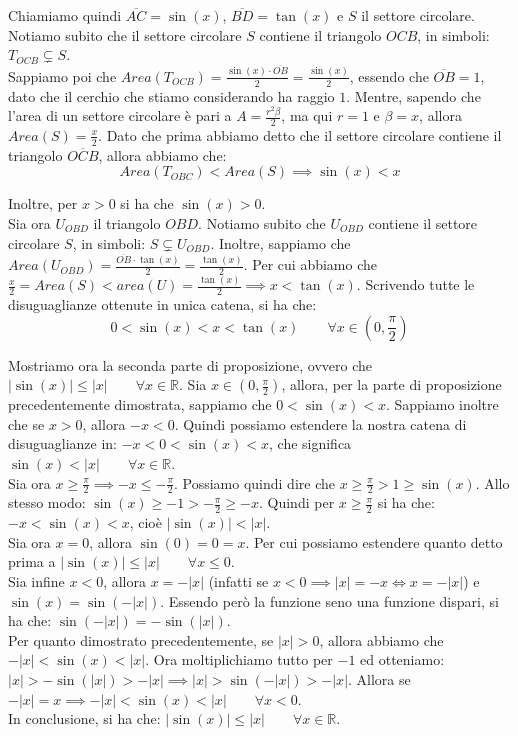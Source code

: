 \documentclass{article}
\begin{document}
\noindent Chiamiamo quindi $\overline{AC} = \sin(x)$, $\overline{BD} = \tan(x)$ e $S$ il settore circolare. Notiamo subito che il settore circolare $S$ contiene il triangolo $OCB$, in simboli: $T_{OCB} \subsetneq S$.\\
Sappiamo poi che $Area(T_{OCB}) = \frac{\sin(x) \cdot \overline{OB}}{2} = \frac{\sin(x)}{2}$, essendo che $\overline{OB} = 1$, dato che il cerchio che stiamo considerando ha raggio $1$. Mentre, sapendo che l'area di un settore circolare è pari a $A = \frac{r^2 \beta}{2}$, ma qui $r = 1$ e $\beta = x$, allora $Area(S) = \frac{x}{2}$. Dato che prima abbiamo detto che il settore circolare contiene il triangolo $\overline{OCB}$, allora abbiamo che:
\begin{equation*}
    Area(T_{OBC}) < Area(S) \implies \sin(x) < x
\end{equation*}

\noindent Inoltre, per $x > 0$ si ha che $\sin(x) > 0$.\\
Sia ora $U_{OBD}$ il triangolo $OBD$. Notiamo subito che $U_{OBD}$ contiene il settore circolare $S$, in simboli: $S \subsetneq U_{OBD}$. Inoltre, sappiamo che $Area(U_{OBD}) = \frac{\overline{OB} \cdot \tan(x)}{2} = \frac{\tan(x)}{2}$. Per cui abbiamo che $\frac{x}{2} = Area(S) < area(U) = \frac{\tan(x)}{2} \implies x < \tan(x)$. Scrivendo tutte le disuguaglianze ottenute in unica catena, si ha che:
\begin{equation*}
    0 < \sin(x) < x < \tan(x) \qquad \forall x \in \left(0, \frac{\pi}{2}\right)
\end{equation*}

\noindent Mostriamo ora la seconda parte di proposizione, ovvero che $|\sin(x)| \leq |x| \qquad \forall x \in \mathbb{R}$. Sia $x \in (0, \frac{\pi}{2})$, allora, per la parte di proposizione precedentemente dimostrata, sappiamo che $0 < \sin(x) < x$. Sappiamo inoltre che se $x > 0$, allora $-x < 0$. Quindi possiamo estendere la nostra catena di disuguaglianze in: $-x < 0 < \sin(x) < x$, che significa $\sin(x) < |x| \qquad \forall x \in \mathbb{R}$.\\
Sia ora $x \geq \frac{\pi}{2} \implies -x \leq -\frac{\pi}{2}$. Possiamo quindi dire che $x \geq \frac{\pi}{2} > 1 \geq \sin(x)$. Allo stesso modo: $\sin(x) \geq -1 > -\frac{\pi}{2} \geq -x$. Quindi per $x \geq \frac{\pi}{2}$ si ha che: $-x < \sin(x) < x$, cioè $|\sin(x)| < |x|$.\\
Sia ora $x = 0$, allora $\sin(0) = 0 = x$. Per cui possiamo estendere quanto detto prima a $|\sin(x)| \leq |x| \qquad \forall x \leq 0$.\\
Sia infine $x < 0$, allora $x = -|x|$ (infatti se $x < 0 \implies |x| = -x \iff x = -|x|$) e $\sin(x) = \sin(-|x|)$. Essendo però la funzione seno una funzione dispari, si ha che: $\sin(-|x|) = -\sin(|x|)$.\\
Per quanto dimostrato precedentemente, se $|x| > 0$, allora abbiamo che $-|x| < \sin(x) < |x|$. Ora moltiplichiamo tutto per $-1$ ed otteniamo: $|x| > -\sin(|x|) > -|x| \implies |x| > \sin(-|x|) > -|x|$. Allora se $-|x| = x \implies -|x| < \sin(x) < |x| \qquad \forall x < 0$.\\
In conclusione, si ha che: $|\sin(x)| \leq |x| \qquad \forall x \in \mathbb{R}$.\\
\end{document}
